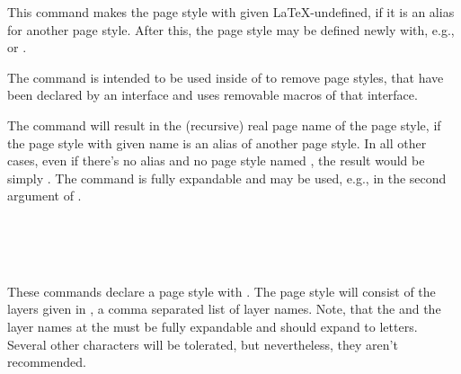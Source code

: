 \begin{Declaration}
\end{Declaration}
%
This command makes the page style with given 
\LaTeX-undefined, if it is an alias for another page style. After this, the
page style may be defined newly with, e.g., 
or . 

The command is intended to be used inside of
 to remove page styles, that have been
declared by an interface and uses removable macros of that interface.%

\begin{Declaration}
\end{Declaration}
%
The command will result in the (recursive) real page name of the page style,
if the page style with given name  is an alias of
another page style. In all other cases, even if there's no alias and no page
style named , the result would be simply . The command is fully expandable and may be used, e.g., in the
second argument of .%

\begin{Declaration}
  \\
  \\
  \\
\end{Declaration}
%
%
%
%
These commands declare a page style with . The page
style will consist of the layers given in , a comma
separated list of layer names. Note, that the  and the
layer names at the  must be fully expandable and should
expand to letters. Several other characters will be tolerated, but
nevertheless, they aren't recommended.

